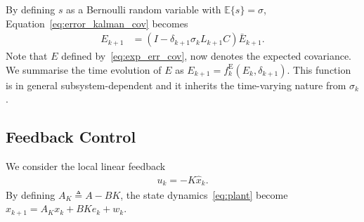 \documentclass[letterpaper, 10 pt, conference]{ieeeconf}  %
\newcommand{\E}{\mathbb{E}}
\newcommand{\commvar}{\delta}
\begin{document}
By defining $s$ as a Bernoulli random variable with $\E\{s\}=\sigma$, 
%
Equation~\eqref{eq:error_kalman_cov} becomes
\begin{align}
E_{k+1}&= (I-\delta_{k+1} \sigma_k L_{k+1}C) 
\bar E_{k+1}.
\label{eq:exp_err_cov}
\end{align}
Note that $E$ defined by~\eqref{eq:exp_err_cov}, now denotes the expected covariance. %
We summarise the time evolution of %
$E$ %
as 
$E_{k+1}=f^\mathrm{E}_k(E_k,\delta_{k+1})$. This function is in general subsystem-dependent and it inherits the time-varying nature from $\sigma_k$.

\subsection{Feedback Control}

We consider the local linear feedback %
\begin{align}
	\label{eq:controller}
	u_k=-K\hat x_k.
\end{align} 
By defining $A_K\triangleq A-BK$, the state dynamics~\eqref{eq:plant} become $x_{k+1}= A_Kx_k + BK e_k + w_k$.
\end{document}
